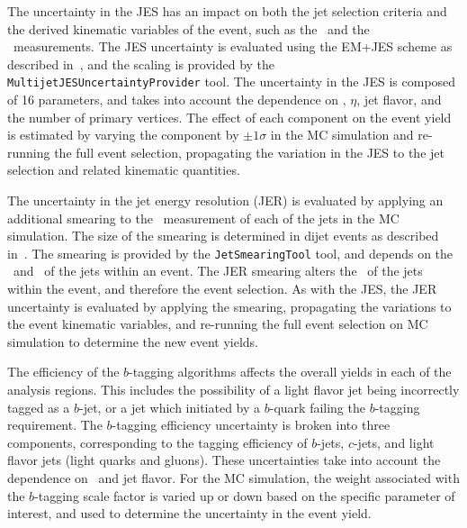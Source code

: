 The uncertainty in the JES has an impact on both the jet
selection criteria and the derived kinematic variables of the event, such as
the \HT\ and the \MET\ measurements.
The JES uncertainty is evaluated using the EM+JES scheme as described
in~\cite{JES}, and the scaling is provided by the
\texttt{MultijetJESUncertaintyProvider} tool.
The uncertainty in the JES is composed of 16 parameters, and takes into account
the dependence on \pt, $\eta$, jet flavor, and the number of primary vertices.
The effect of each component on the event yield is estimated by varying the
component by $\pm 1 \sigma$ in the MC simulation and re-running the full event
selection, propagating the variation in the JES to the jet selection and related
kinematic quantities.

The uncertainty in the jet energy resolution (JER) is evaluated by applying an
additional smearing to the \pt\ measurement of each of the jets in the MC
simulation.
The size of the smearing is determined in dijet events as described
in~\cite{JER}.
The smearing is provided by the \texttt{JetSmearingTool} tool, and depends on
the \pt\ and \eta\ of the jets within an event.
The JER smearing alters the \pt\ of the jets within the event, and therefore
the event selection.
As with the JES, the JER uncertainty is evaluated by applying the smearing,
propagating the variations to the event kinematic variables, and
re-running the full event selection on MC simulation to determine the new
event yields.

The efficiency of the $b$-tagging
algorithms affects the overall yields in each of the analysis regions.
This includes the possibility of a light flavor jet being incorrectly tagged
as a $b$-jet, or a jet which initiated by a $b$-quark failing the $b$-tagging
requirement.
The $b$-tagging efficiency uncertainty is broken into three components,
corresponding to the tagging efficiency of $b$-jets, $c$-jets, and light
flavor jets (light quarks and gluons).
These uncertainties take into account the dependence on \pt\ and jet flavor.
For the MC simulation, the weight associated with the $b$-tagging scale factor
is varied up or down based on the specific parameter of interest, and used to
determine the uncertainty in the event yield.

